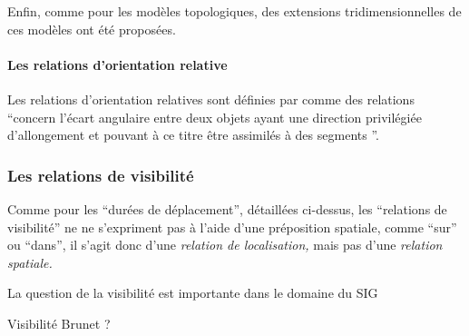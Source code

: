 


Enfin, comme pour les modèles topologiques, des extensions
tridimensionnelles de ces modèles ont été proposées.



\paragraph{Les relations d'orientation relative}

Les relations d'orientation relatives sont définies par
\textcite{Duchene2019} comme des relations
\enquote{concern l'écart angulaire entre deux objets
  ayant une direction privilégiée d'allongement et pouvant à ce titre
  être assimilés à des segments \textelp{}}.







\subsubsection{Les relations de visibilité}

Comme pour les \enquote{durées de déplacement}, détaillées ci-dessus,
les \enquote{relations de visibilité} ne ne s'expriment pas à l'aide
d'une préposition spatiale, comme \enquote{sur} ou \enquote{dans}, il
s'agit donc d'une \emph{relation de localisation,} mais pas d'une
\emph{relation spatiale.}

La question de la visibilité est importante dans le domaine du SIG

Visibilité Brunet ?





